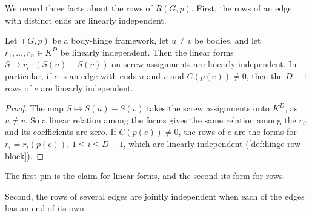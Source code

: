 We record three facts about the rows of $R(G,p)$. First, the rows of an
edge with distinct ends are linearly independent.

\begin{lemma}
  \label{lem:edge-rows-independent}
  \leanok
  Let $(G,p)$ be a body-hinge framework, let $u \neq v$ be bodies, and
  let $r_1, \dots, r_n \in K^D$ be linearly independent. Then the linear
  forms $S \mapsto r_i \cdot (S(u) - S(v))$ on screw assignments are
  linearly independent. In particular, if $e$ is an edge with ends $u$
  and $v$ and $C(p(e)) \neq 0$, then the $D - 1$ rows of $e$ are
  linearly independent.
\end{lemma}
\begin{proof}
  \leanok
  The map $S \mapsto S(u) - S(v)$ takes the screw assignments onto
  $K^D$, as $u \neq v$. So a linear relation among the forms gives the
  same relation among the $r_i$, and its coefficients are zero. If
  $C(p(e)) \neq 0$, the rows of $e$ are the forms for $r_i = r_i(p(e))$,
  $1 \le i \le D - 1$, which are linearly independent
  (\cref{def:hinge-row-block}).
\end{proof}

\begin{fmlnote}
  The first pin is the claim for linear forms, and the second its form
  for rows.
\end{fmlnote}

Second, the rows of several edges are jointly independent when each of
the edges has an end of its own.

